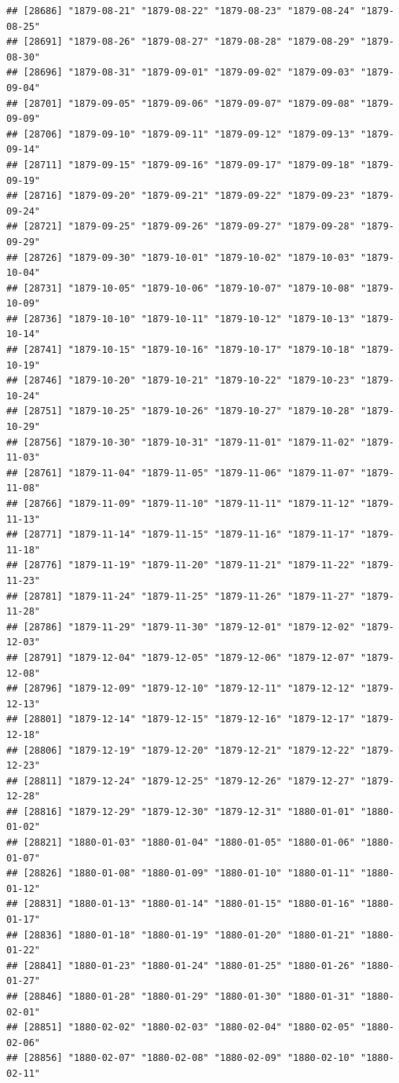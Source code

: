 \documentclass{article}\usepackage[]{graphicx}\usepackage[]{color}
\makeatletter
\newenvironment{kframe}{%
 \def\at@end@of@kframe{}%
 \ifinner\ifhmode%
  \def\at@end@of@kframe{\end{minipage}}%
  \begin{minipage}{\columnwidth}%
 \fi\fi%
 \def\FrameCommand##1{\hskip\@totalleftmargin \hskip-\fboxsep
 \colorbox{shadecolor}{##1}\hskip-\fboxsep
     \hskip-\linewidth \hskip-\@totalleftmargin \hskip\columnwidth}%
 \MakeFramed {\advance\hsize-\width
   \@totalleftmargin\z@ \linewidth\hsize
   \@setminipage}}%
 {\par\unskip\endMakeFramed%
 \at@end@of@kframe}
\newenvironment{knitrout}{}{} %
\makeatother
\begin{document}
\begin{description}
\begin{knitrout}
\begin{kframe}
\begin{verbatim}
## [28686] "1879-08-21" "1879-08-22" "1879-08-23" "1879-08-24" "1879-08-25"
## [28691] "1879-08-26" "1879-08-27" "1879-08-28" "1879-08-29" "1879-08-30"
## [28696] "1879-08-31" "1879-09-01" "1879-09-02" "1879-09-03" "1879-09-04"
## [28701] "1879-09-05" "1879-09-06" "1879-09-07" "1879-09-08" "1879-09-09"
## [28706] "1879-09-10" "1879-09-11" "1879-09-12" "1879-09-13" "1879-09-14"
## [28711] "1879-09-15" "1879-09-16" "1879-09-17" "1879-09-18" "1879-09-19"
## [28716] "1879-09-20" "1879-09-21" "1879-09-22" "1879-09-23" "1879-09-24"
## [28721] "1879-09-25" "1879-09-26" "1879-09-27" "1879-09-28" "1879-09-29"
## [28726] "1879-09-30" "1879-10-01" "1879-10-02" "1879-10-03" "1879-10-04"
## [28731] "1879-10-05" "1879-10-06" "1879-10-07" "1879-10-08" "1879-10-09"
## [28736] "1879-10-10" "1879-10-11" "1879-10-12" "1879-10-13" "1879-10-14"
## [28741] "1879-10-15" "1879-10-16" "1879-10-17" "1879-10-18" "1879-10-19"
## [28746] "1879-10-20" "1879-10-21" "1879-10-22" "1879-10-23" "1879-10-24"
## [28751] "1879-10-25" "1879-10-26" "1879-10-27" "1879-10-28" "1879-10-29"
## [28756] "1879-10-30" "1879-10-31" "1879-11-01" "1879-11-02" "1879-11-03"
## [28761] "1879-11-04" "1879-11-05" "1879-11-06" "1879-11-07" "1879-11-08"
## [28766] "1879-11-09" "1879-11-10" "1879-11-11" "1879-11-12" "1879-11-13"
## [28771] "1879-11-14" "1879-11-15" "1879-11-16" "1879-11-17" "1879-11-18"
## [28776] "1879-11-19" "1879-11-20" "1879-11-21" "1879-11-22" "1879-11-23"
## [28781] "1879-11-24" "1879-11-25" "1879-11-26" "1879-11-27" "1879-11-28"
## [28786] "1879-11-29" "1879-11-30" "1879-12-01" "1879-12-02" "1879-12-03"
## [28791] "1879-12-04" "1879-12-05" "1879-12-06" "1879-12-07" "1879-12-08"
## [28796] "1879-12-09" "1879-12-10" "1879-12-11" "1879-12-12" "1879-12-13"
## [28801] "1879-12-14" "1879-12-15" "1879-12-16" "1879-12-17" "1879-12-18"
## [28806] "1879-12-19" "1879-12-20" "1879-12-21" "1879-12-22" "1879-12-23"
## [28811] "1879-12-24" "1879-12-25" "1879-12-26" "1879-12-27" "1879-12-28"
## [28816] "1879-12-29" "1879-12-30" "1879-12-31" "1880-01-01" "1880-01-02"
## [28821] "1880-01-03" "1880-01-04" "1880-01-05" "1880-01-06" "1880-01-07"
## [28826] "1880-01-08" "1880-01-09" "1880-01-10" "1880-01-11" "1880-01-12"
## [28831] "1880-01-13" "1880-01-14" "1880-01-15" "1880-01-16" "1880-01-17"
## [28836] "1880-01-18" "1880-01-19" "1880-01-20" "1880-01-21" "1880-01-22"
## [28841] "1880-01-23" "1880-01-24" "1880-01-25" "1880-01-26" "1880-01-27"
## [28846] "1880-01-28" "1880-01-29" "1880-01-30" "1880-01-31" "1880-02-01"
## [28851] "1880-02-02" "1880-02-03" "1880-02-04" "1880-02-05" "1880-02-06"
## [28856] "1880-02-07" "1880-02-08" "1880-02-09" "1880-02-10" "1880-02-11"

\end{verbatim}
\end{kframe}
\end{knitrout}
\end{description}
\end{document}
